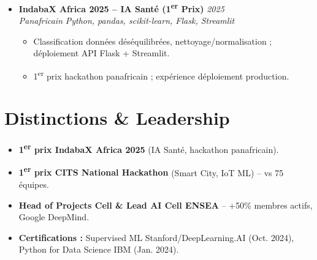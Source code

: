\documentclass[a4paper,11pt]{article}
\begin{document}
\begin{itemize}[leftmargin=*, label=\tiny$\bullet$, nosep]
    \item \textbf{IndabaX Africa 2025 -- IA Sant\'e (1\textsuperscript{er} Prix)} \hfill \textit{2025} \\
    \textit{Panafricain} \hfill \textit{Python, pandas, scikit-learn, Flask, Streamlit}
    \vspace{-2pt}
    \begin{itemize}[leftmargin=0.4cm, nosep, label=\tiny$\bullet$]
        \item \small{Classification donn\'ees d\'es\'equilibr\'ees, nettoyage/normalisation ; d\'eploiement API Flask + Streamlit.}
        \item \small{1\textsuperscript{er} prix hackathon panafricain ; exp\'erience d\'eploiement production.}
    \end{itemize}
\end{itemize}

\section{Distinctions \& Leadership}
\begin{itemize}[leftmargin=*, label=\tiny$\bullet$, nosep]
    \item \small{\textbf{1\textsuperscript{er} prix IndabaX Africa 2025} (IA Sant\'e, hackathon panafricain).}
    \item \small{\textbf{1\textsuperscript{er} prix CITS National Hackathon} (Smart City, IoT ML) -- vs 75 \'equipes.}
    \item \small{\textbf{Head of Projects Cell \& Lead AI Cell ENSEA} -- +50\% membres actifs, Google DeepMind.}
    \item \small{\textbf{Certifications :} Supervised ML Stanford/DeepLearning.AI (Oct. 2024), Python for Data Science IBM (Jan. 2024).}
\end{itemize}
\end{document}
